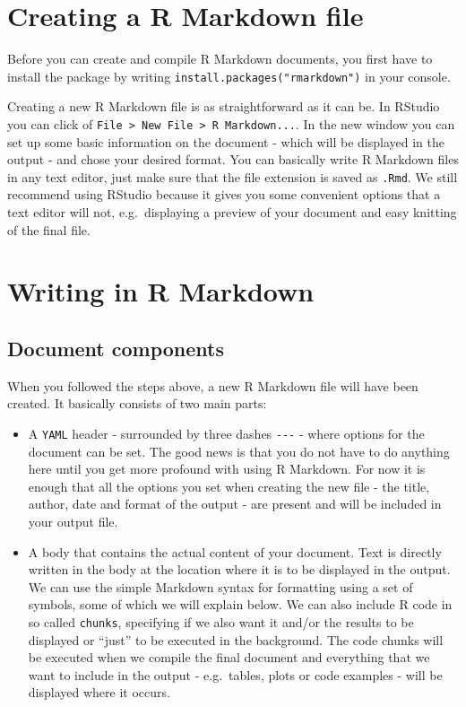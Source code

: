 \documentclass[
]{book}
\begin{document}
\hypertarget{creating-a-r-markdown-file}{%
\section{Creating a R Markdown file}\label{creating-a-r-markdown-file}}

Before you can create and compile R Markdown documents, you first have to install the package by writing \texttt{install.packages("rmarkdown")} in your console.

Creating a new R Markdown file is as straightforward as it can be. In RStudio you can click of \texttt{File\ \textgreater{}\ New\ File\ \textgreater{}\ R\ Markdown...}. In the new window you can set up some basic information on the document - which will be displayed in the output - and chose your desired format. You can basically write R Markdown files in any text editor, just make sure that the file extension is saved as \texttt{.Rmd}. We still recommend using RStudio because it gives you some convenient options that a text editor will not, e.g.~displaying a preview of your document and easy knitting of the final file.

\hypertarget{writing-in-r-markdown}{%
\section{Writing in R Markdown}\label{writing-in-r-markdown}}

\hypertarget{document-components}{%
\subsection{Document components}\label{document-components}}

When you followed the steps above, a new R Markdown file will have been created. It basically consists of two main parts:

\begin{itemize}
\item
  A \texttt{YAML} header - surrounded by three dashes \texttt{-\/-\/-} - where options for the document can be set. The good news is that you do not have to do anything here until you get more profound with using R Markdown. For now it is enough that all the options you set when creating the new file - the title, author, date and format of the output - are present and will be included in your output file.
\item
  A body that contains the actual content of your document. Text is directly written in the body at the location where it is to be displayed in the output. We can use the simple Markdown syntax for formatting using a set of symbols, some of which we will explain below. We can also include R code in so called \texttt{chunks}, specifying if we also want it and/or the results to be displayed or ``just'' to be executed in the background. The code chunks will be executed when we compile the final document and everything that we want to include in the output - e.g.~tables, plots or code examples - will be displayed where it occurs.
\end{itemize}
\end{document}
